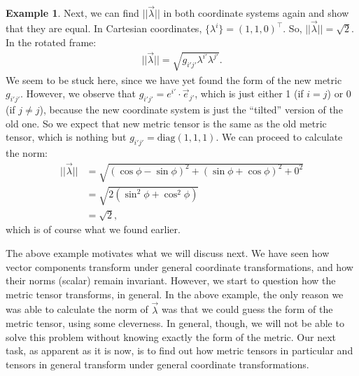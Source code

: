 \documentclass{article}
\theoremstyle{definition}
\newtheorem{exmp}{Example}[section]
\begin{document}
\begin{exmp}
	Next, we can find $\vert\vert \vec{\lambda} \vert\vert$ in both coordinate systems again and show that they are equal. In Cartesian coordinates, $\{\lambda^i\} = (1,1,0)^\top$. So, $\vert\vert \vec{\lambda} \vert\vert = \sqrt{2}$. In the rotated frame:
	\begin{align*}
	\vert\vert\vec{\lambda}\vert\vert = \sqrt{g_{i'j'}\lambda^{i'}\lambda^{j'}}.
	\end{align*}
	We seem to be stuck here, since we have yet found the form of the new metric $g_{i'j'}$. However, we observe that $g_{i'j'} = e^{i'}\cdot\vec{e}_{j'}$, which is just either 1 (if $i=j$) or 0 (if $j\neq j$), because the new coordinate system is just the ``tilted'' version of the old one. So we expect that new metric tensor is the same as the old metric tensor, which is nothing but $g_{i'j'}=\text{diag}(1,1,1)$. We can proceed to calculate the norm:
	\begin{align*}
	\vert\vert\vec{\lambda}\vert\vert &= \sqrt{\left( \cos\phi - \sin\phi \right)^2 + \left( \sin\phi + \cos\phi \right)^2 + 0^2}\\
	&= \sqrt{2\left(\sin^2\phi + \cos^2\phi\right) }\\
	&= \sqrt{2},
	\end{align*}
	which is of course what we found earlier. 
\end{exmp}
The above example motivates what we will discuss next. We have seen how vector components transform under general coordinate transformations, and how their norms (scalar) remain invariant. However, we start to question how the metric tensor transforms, in general. In the above example, the only reason we was able to calculate the norm of $\vec{\lambda}$ was that we could guess the form of the metric tensor, using some cleverness. In general, though, we will not be able to solve this problem without knowing exactly the form of the metric. Our next task, as apparent as it is now, is to find out how metric tensors in particular and tensors in general transform under general coordinate transformations. 
\end{document}
